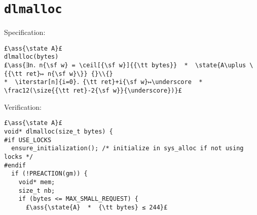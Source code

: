 \documentclass[10pt,twoside]{report}
\makeatletter
\newcommand{\code}[1]{\texttt{#1}}
\newcommand{\ml}[2][t]{\mbox{\mdseries\begin{tabular}[#1]{@{}L@{}}#2\end{tabular}}}
\newcommand{\ass}[1]{\ensuremath{{\color{blue}\left\{\ml[c]{#1}\right\}}}}
\renewcommand{\ceil}[2][]{\left\lceil{#2}\right\rceil_{#1}}
\newcommand{\iterstar}[2][]{\text{\LARGE $*$}^{#1}_{#2}}
\makeatother
\begin{document}
\begin{ribbonproof}
\\
 \rib\rB{} \rib\rE{} \rib\rF{}
\\
\asm{\gap[\rA] \rib\rG{} \closerib\rH \closerib\rI \closerib\rD \rib\rJ{}} \rib\rB{} \rib\rE{} \rib\rF{}
\\
\asm{\gap[\rA] \rib\rG{} \openrib\rL \rib\rJ{}} \rib\rB{} \rib\rE{} \rib\rF{}
\\
 \rib\rB{} \rib\rE{} \rib\rF{}
\\
\closeasm\rP \rib\rB{} \rib\rE{} \rib\rF{}
\\
\com\rP{\code{\}}} \rib\rB{} \rib\rE{} \rib\rF{}
\\
\gap \gap[\rA] \rib\rG{} \rib\rL{} \rib\rJ{} \gap \rib\rB{} \rib\rE{} \rib\rF{}
\\
\gap \gap[\rA] \rib\rG{} \closerib\rL \closerib\rJ \gap  \closerib\rB \rib\rE{} \rib\rF{}
\\
\gap \gap[\rA] \rib\rG{} \openrib\rM \rib\rE{} \rib\rF{}
\\
\gap \gap[\rA] \rib\rG{} \rib{} \rib\rE{} \rib\rF{}
\end{ribbonproof}



\chapter{{\tt dlmalloc}}

Specification:
\begin{lstlisting}
£\ass{\state A}£
dlmalloc(bytes)
£\ass{∃n．n{\sf w} = \ceil[{\sf w}]{{\tt bytes}}  *  \state{A\uplus \{{\tt ret}↦ n{\sf w}\}} {}\\{} 
*  \iterstar[n]{i=0}．{\tt ret}+i{\sf w}↦\underscore  *  \frac12(\size{{\tt ret}-2{\sf w}}{\underscore})}£
\end{lstlisting}

\noindent Verification:


\setcounter{lstnumber}{0}
\begin{lstlisting}
£\ass{\state A}£
void* dlmalloc(size_t bytes) {
#if USE_LOCKS
  ensure_initialization(); /* initialize in sys_alloc if not using locks */
#endif
  if (!PREACTION(gm)) {
    void* mem;
    size_t nb;
    if (bytes <= MAX_SMALL_REQUEST) {
      £\ass{\state{A}  *  {\tt bytes} ≤ 244}£
\end{lstlisting}
\end{document}
